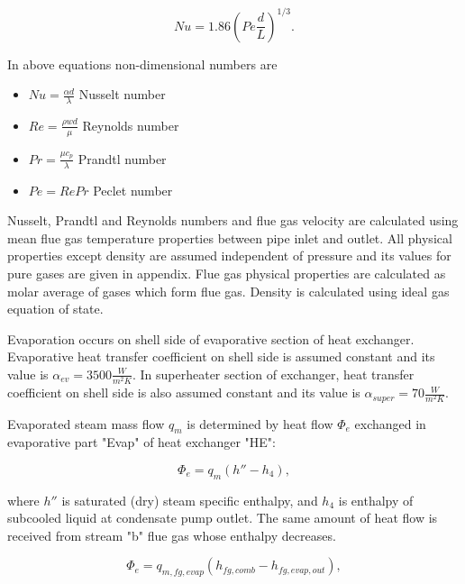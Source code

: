 \documentclass{article}
\begin{document}
	\begin{equation}\label{eq:nusselt2}
		Nu = 1.86 \left(Pe \frac{d}{L}\right)^{1/3}.
	\end{equation}
	
	\noindent
	In above equations non-dimensional numbers are
	
	\begin{itemize}
		\item $Nu = \frac{\alpha d}{\lambda}$ Nusselt number
		\item $Re = \frac{\rho w d}{\mu}$ Reynolds number
		\item $Pr = \frac{\mu c_p}{\lambda}$ Prandtl number
		\item $Pe = Re Pr$ Peclet number
	\end{itemize}

	\noindent
	Nusselt, Prandtl and Reynolds numbers and flue gas velocity are calculated using mean flue gas temperature properties between pipe inlet and outlet. All physical properties except density are assumed independent of pressure and its values for pure gases are given in appendix. Flue gas physical properties are calculated as molar average of gases which form flue gas. Density is calculated using ideal gas equation of state.
	
	\noindent
	Evaporation occurs on shell side of evaporative section of heat exchanger. Evaporative heat transfer coefficient on shell side is assumed constant and its value is $\alpha_{ev}=3500 \frac{W}{m^2 K}$. In superheater section of exchanger, heat transfer coefficient on shell side is also assumed constant and its value is $\alpha_{super}=70 \frac{W}{m^2 K}$.
	
	Evaporated steam mass flow $q_m$ is determined by heat flow $\Phi_e$ exchanged in evaporative part "Evap" of heat exchanger "HE":
	
	\begin{equation}\label{eq:evap_steam_mass}
		\Phi_e = q_m(h'' -h_4),
	\end{equation}
	
	where $h''$ is saturated (dry) steam specific enthalpy, and $h_4$ is 
	enthalpy of subcooled liquid at condensate pump outlet. 
	The same amount of heat flow is received from stream "b" flue gas whose enthalpy decreases.
	
	\begin{equation}\label{eq:evap_steam_mass2}
		\Phi_e = q_{m,fg,evap} (h_{fg,comb} - h_{fg,evap,out}),
	\end{equation}
	
\end{document}

